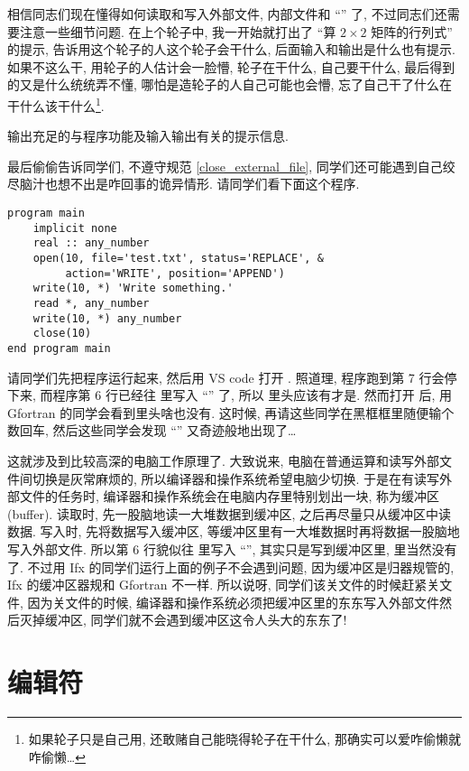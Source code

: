 相信同志们现在懂得如何读取和写入外部文件, 内部文件和 ``\ttt{*}'' 了, 不过同志们还需要注意一些细节问题. 在上个轮子中, 我一开始就打出了 ``算 $ 2\times2 $ 矩阵的行列式'' 的提示, 告诉用这个轮子的人这个轮子会干什么, 后面输入和输出是什么也有提示. 如果不这么干, 用轮子的人估计会一脸懵, 轮子在干什么, 自己要干什么, 最后得到的又是什么统统弄不懂, 哪怕是造轮子的人自己可能也会懵, 忘了自己干了什么在干什么该干什么\footnote{如果轮子只是自己用, 还敢赌自己能晓得轮子在干什么, 那确实可以爱咋偷懒就咋偷懒\dots{}}. 
\begin{convention}
    输出充足的与程序功能及输入输出有关的提示信息. 
\end{convention}

最后偷偷告诉同学们, 不遵守规范 \ref{close_external_file}, 同学们还可能遇到自己绞尽脑汁也想不出是咋回事的诡异情形. 请同学们看下面这个程序.
\begin{lstlisting}
program main
    implicit none
    real :: any_number
    open(10, file='test.txt', status='REPLACE', &
         action='WRITE', position='APPEND')
    write(10, *) 'Write something.'
    read *, any_number
    write(10, *) any_number
    close(10)
end program main
\end{lstlisting}
请同学们先把程序运行起来, 然后用 VS code 打开 . 照道理, 程序跑到第 7 行会停下来, 而程序第 6 行已经往  里写入 ``'' 了, 所以  里头应该有才是. 然而打开  后, 用 Gfortran 的同学会看到里头啥也没有. 这时候, 再请这些同学在黑框框里随便输个数回车, 然后这些同学会发现 ``'' 又奇迹般地出现了\dots{}

这就涉及到比较高深的电脑工作原理了. 大致说来, 电脑在普通运算和读写外部文件间切换是灰常麻烦的, 所以编译器和操作系统希望电脑少切换. 于是在有读写外部文件的任务时, 编译器和操作系统会在电脑内存里特别划出一块, 称为缓冲区 (buffer). 读取时, 先一股脑地读一大堆数据到缓冲区, 之后再尽量只从缓冲区中读数据. 写入时, 先将数据写入缓冲区, 等缓冲区里有一大堆数据时再将数据一股脑地写入外部文件. 所以第 6 行貌似往  里写入 ``'', 其实只是写到缓冲区里,  里当然没有了. 不过用 Ifx 的同学们运行上面的例子不会遇到问题, 因为缓冲区是归器规管的, Ifx 的缓冲区器规和 Gfortran 不一样. 所以说呀, 同学们该关文件的时候赶紧关文件, 因为关文件的时候, 编译器和操作系统必须把缓冲区里的东东写入外部文件然后灭掉缓冲区, 同学们就不会遇到缓冲区这令人头大的东东了!

\section{编辑符}\label{fortran_edit_descriptor}

